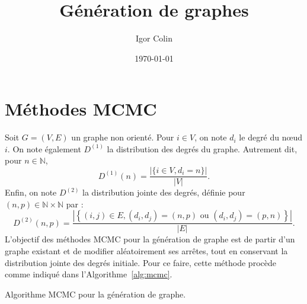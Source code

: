 \documentclass[a4paper]{article}
\title{Génération de graphes}
\author{Igor Colin}
\date{\today}
\begin{document}
\section{Méthodes MCMC}
\label{sec:methodes_mcmc}
    Soit $G = (V, E)$ un graphe non orienté. Pour $i \in V$, on note $d_i$ le
    degré du n\oe{}ud $i$. On note également $D^{(1)}$ la distribution des
    degrés du graphe. Autrement dit, pour $n \in \mathbb{N}$,
    \[
        D^{(1)}(n) = \frac{|\{i \in V, d_i = n\}|}{|V|}.
    \]
    Enfin, on note $D^{(2)}$ la distribution jointe des degrés, définie pour
    $(n, p) \in \mathbb{N} \times \mathbb{N}$ par :
    \[
        D^{(2)}(n, p) = \frac{|\left\{ (i, j) \in E, (d_i, d_j) = (n, p)
            \text{ ou } (d_i, d_j) = (p, n)\right\}|}{|E|}.
    \]
    L'objectif des méthodes MCMC pour la génération de graphe est de partir
    d'un graphe existant et de modifier aléatoirement ses arrêtes, tout en
    conservant la distribution jointe des degrés initiale. Pour ce faire,
    cette méthode procède comme indiqué dans l'Algorithme~\ref{alg:mcmc}.

    \begin{algorithm}
        \caption{Algorithme MCMC pour la génération de graphe.}
        \label{alg:mcmc}
    \end{algorithm}
\end{document}
